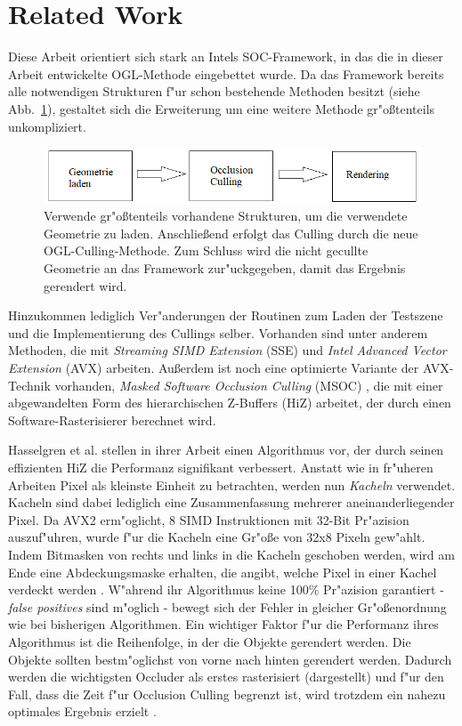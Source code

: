 \documentclass[journal]{vgtc}
\begin{document}
\section{Related Work}
Diese Arbeit orientiert sich stark an Intels SOC-Framework, in das die in dieser Arbeit entwickelte OGL-Methode eingebettet wurde.
Da das Framework bereits alle notwendigen Strukturen f"ur schon bestehende Methoden besitzt (siehe Abb.\ \ref{fig:ablaufframework}), gestaltet sich die Erweiterung um eine weitere Methode gr"o{\ss}tenteils unkompliziert. 
\begin{figure}%
\includegraphics[width=\columnwidth]{images/AblaufFramework.png}%
\caption{Verwende gr"o{\ss}tenteils vorhandene Strukturen, um die verwendete Geometrie zu laden. Anschlie{\ss}end erfolgt das Culling durch die neue OGL-Culling-Methode. Zum Schluss wird die nicht gecullte Geometrie an das Framework zur"uckgegeben, damit das Ergebnis gerendert wird.}%
\label{fig:ablaufframework}%
\end{figure}
Hinzukommen lediglich Ver"anderungen der Routinen zum Laden der Testszene und die Implementierung des Cullings selber.
Vorhanden sind unter anderem Methoden, die mit \textit{Streaming SIMD Extension} (SSE) und \textit{Intel Advanced Vector Extension} (AVX) arbeiten.
Au{\ss}erdem ist noch eine optimierte Variante der AVX-Technik vorhanden, \textit{Masked Software Occlusion Culling} (MSOC) \cite{MSOC}, die mit einer abgewandelten Form des hierarchischen Z-Buffers (HiZ) \cite{HiZ} arbeitet, der durch einen Software-Rasterisierer berechnet wird.

Hasselgren et al. \cite{MSOC} stellen in ihrer Arbeit einen Algorithmus vor, der durch seinen effizienten HiZ die Performanz signifikant verbessert.
Anstatt wie in fr"uheren Arbeiten Pixel als kleinste Einheit zu betrachten, werden nun \textit{Kacheln} verwendet.
Kacheln sind dabei lediglich eine Zusammenfassung mehrerer aneinanderliegender Pixel.
Da AVX2 erm"oglicht, 8 SIMD Instruktionen mit 32-Bit Pr"azision auszuf"uhren, wurde f"ur die Kacheln eine Gr"o\ss{}e von 32x8 Pixeln gew"ahlt.
Indem Bitmasken von rechts und links in die Kacheln geschoben werden, wird am Ende eine Abdeckungsmaske erhalten, die angibt, welche Pixel in einer Kachel verdeckt werden \cite{MSOC}.
W"ahrend ihr Algorithmus keine 100\% Pr"azision garantiert - \textit{false positives} sind m"oglich - bewegt sich der Fehler in gleicher Gr"o\ss{}enordnung wie bei bisherigen Algorithmen.
Ein wichtiger Faktor f"ur die Performanz ihres Algorithmus ist die Reihenfolge, in der die Objekte gerendert werden.
Die Objekte sollten bestm"oglichst von vorne nach hinten gerendert werden.
Dadurch werden die wichtigsten Occluder als erstes rasterisiert (dargestellt) und f"ur den Fall, dass die Zeit f"ur Occlusion Culling begrenzt ist, wird trotzdem ein nahezu optimales Ergebnis erzielt \cite{MSOC}.\\
\end{document}

